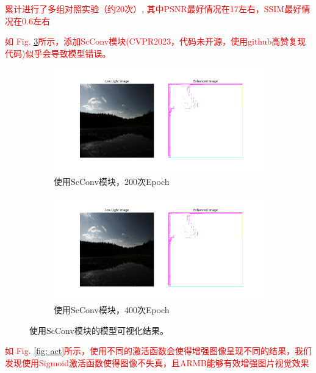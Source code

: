 \documentclass[a4paper]{ctexart}
\begin{document}
		\textcolor{red}{累计进行了多组对照实验（约20次）, 其中PSNR最好情况在17左右，SSIM最好情况在0.6左右}
		
		\textcolor{red}{如 Fig. \ref{fig: myplot_ScConv}所示，添加ScConv模块(CVPR2023，代码未开源，使用github高赞复现代码)似乎会导致模型错误。}
		\begin{figure}[htb]
			\centering
			\begin{subfigure}{\textwidth}
				\centering
				\includegraphics[width=0.7\linewidth]{picture/LLIE/Experiment/myplot_ScConv1}
				\captionsetup{font=scriptsize}
				\caption{使用ScConv模块，200次Epoch}
				\label{fig: myplot_ScConv1}
			\end{subfigure}
			\begin{subfigure}{\textwidth}
				\centering
				\includegraphics[width=0.7\linewidth]{picture/LLIE/Experiment/myplot_ScConv2_Epoch200}
				\captionsetup{font=scriptsize}
				\caption{使用ScConv模块，400次Epoch}
				\label{fig: myplot_ScConv2_Epoch200}	
			\end{subfigure}
			\caption{
				\label{fig: myplot_ScConv}
				使用ScConv模块的模型可视化结果。
			}
		\end{figure}
	
		\textcolor{red}{如 Fig. \ref{fig: act}所示，使用不同的激活函数会使得增强图像呈现不同的结果，我们发现使用Sigmoid激活函数使得图像不失真，且ARMB能够有效增强图片视觉效果}
	
\end{document}
